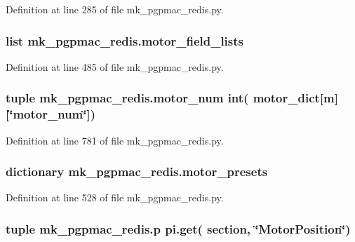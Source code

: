 Definition at line 285 of file mk\-\_\-pgpmac\-\_\-redis.\-py.

\hypertarget{namespacemk__pgpmac__redis_a7228dc1b6ecec376538db1efe8c05ffb}{
\subsubsection[{motor\-\_\-field\-\_\-lists}]{\setlength{\rightskip}{0pt plus 5cm}list mk\-\_\-pgpmac\-\_\-redis.\-motor\-\_\-field\-\_\-lists}}\label{namespacemk__pgpmac__redis_a7228dc1b6ecec376538db1efe8c05ffb}


Definition at line 485 of file mk\-\_\-pgpmac\-\_\-redis.\-py.

\hypertarget{namespacemk__pgpmac__redis_a292515b2acabb0dcade5b16584cdb011}{
\subsubsection[{motor\-\_\-num}]{\setlength{\rightskip}{0pt plus 5cm}tuple mk\-\_\-pgpmac\-\_\-redis.\-motor\-\_\-num int( {\bf motor\-\_\-dict}\mbox{[}m\mbox{]}\mbox{[}\char`\"{}motor\-\_\-num\char`\"{}\mbox{]})}}\label{namespacemk__pgpmac__redis_a292515b2acabb0dcade5b16584cdb011}


Definition at line 781 of file mk\-\_\-pgpmac\-\_\-redis.\-py.

\hypertarget{namespacemk__pgpmac__redis_a2a04d8d0b7270384d1fac674c29e774a}{
\subsubsection[{motor\-\_\-presets}]{\setlength{\rightskip}{0pt plus 5cm}dictionary mk\-\_\-pgpmac\-\_\-redis.\-motor\-\_\-presets}}\label{namespacemk__pgpmac__redis_a2a04d8d0b7270384d1fac674c29e774a}


Definition at line 528 of file mk\-\_\-pgpmac\-\_\-redis.\-py.

\hypertarget{namespacemk__pgpmac__redis_a11daf2847f2dc94562b5b61b3f412574}{
\subsubsection[{p}]{\setlength{\rightskip}{0pt plus 5cm}tuple mk\-\_\-pgpmac\-\_\-redis.\-p pi.\-get( section, \char`\"{}Motor\-Position\char`\"{})}}\label{namespacemk__pgpmac__redis_a11daf2847f2dc94562b5b61b3f412574}


